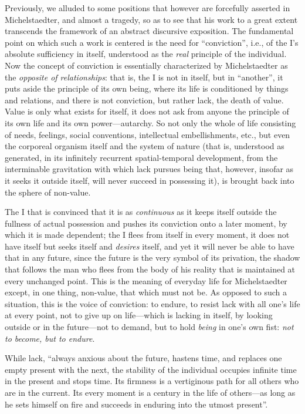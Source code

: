 Previously, we alluded to some positions that however are forcefully asserted in Michelstaedter, and almost a tragedy, so as to see that his work to a great extent transcends the framework of an abstract discursive exposition. The fundamental point on which such a work is centered is the need for ``conviction'', i.e., of the I's absolute sufficiency in itself, understood as the \emph{real} principle of the individual. Now the concept of conviction is essentially characterized by Michelstaedter as the \emph{opposite of relationships}: that is, the I is not in itself, but in ``another'', it puts aside the principle of its own being, where its life is conditioned by things and relations, and there is not conviction, but rather lack, the death of value. Value is only what exists for itself, it does not ask from anyone the principle of its own life and its own power---autarchy. So not only the whole of life consisting of needs, feelings, social conventions, intellectual embellishments, etc., but even the corporeal organism itself and the system of nature (that is, understood as generated, in its infinitely recurrent spatial-temporal development, from the interminable gravitation with which lack pursues being that, however, insofar as it seeks it outside itself, will never succeed in possessing it), is brought back into the sphere of non-value.

The I that is convinced that it is as \emph{continuous} as it keeps itself outside the fullness of actual possession and pushes its conviction onto a later moment, by which it is made dependent; the I flees from itself in every moment, it does not have itself but seeks itself and \emph{desires} itself, and yet it will never be able to have that in any future, since the future is the very symbol of its privation, the shadow that follows the man who flees from the body of his reality that is maintained at every unchanged point. This is the meaning of everyday life for Michelstaedter except, in one thing, non-value, that which must not be. As opposed to such a situation, this is the voice of conviction: to endure, to resist lack with all one's life at every point, not to give up on life---which is lacking in itself, by looking outside or in the future---not to demand, but to hold
\emph{being} in one's own fist: \emph{not to become, but to endure}.


\begin{quotex}
While lack, ``always anxious about the future, hastens time, and replaces one empty present with the next, the stability of the individual occupies infinite time in the present and stops time. Its firmness is a vertiginous path for all others who are in the current. Its every moment is a century in the life of others---as long as he sets himself on fire and succeeds in enduring into the utmost present''.
\end{quotex}


